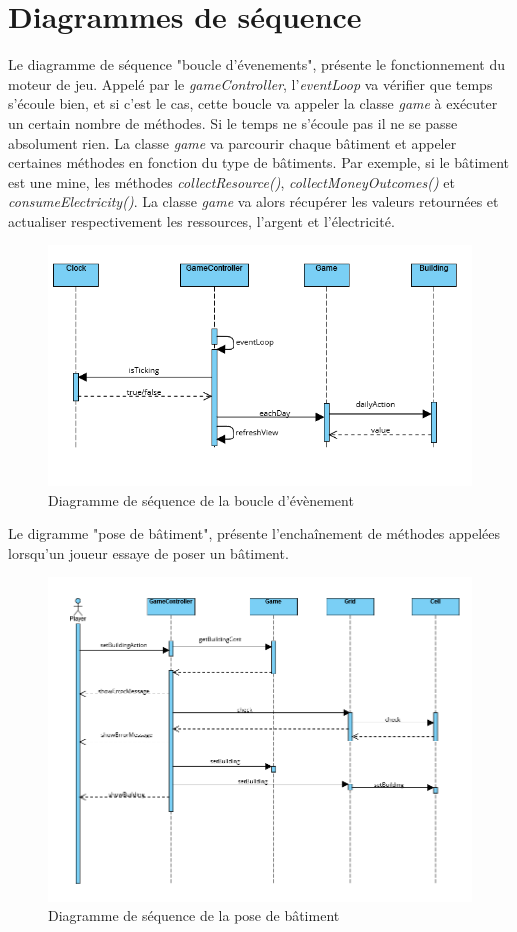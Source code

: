 \newpage
\section{Diagrammes de séquence}

Le diagramme de séquence "boucle d'évenements", présente le fonctionnement du moteur de jeu. Appelé par le \textit{gameController}, l'\textit{eventLoop} va vérifier que temps s'écoule bien, et si c'est le cas, cette boucle va appeler la classe \textit{game} à exécuter un certain nombre de méthodes. Si le temps ne s'écoule pas il ne se passe absolument rien. La classe \textit{game} va parcourir chaque bâtiment et appeler certaines méthodes en fonction du type de bâtiments. Par exemple, si le bâtiment est une mine, les méthodes \textit{collectResource()}, \textit{collectMoneyOutcomes()} et \textit{consumeElectricity()}. La classe \textit{game} va alors récupérer les valeurs retournées et actualiser respectivement les ressources, l'argent et l'électricité.

\begin{figure}[H]
    \centering
    \includegraphics[width=1\linewidth]{images/eventLoop.png}
    \caption{Diagramme de séquence de la boucle d'évènement}
    \label{fig:sequenceEvent}
\end{figure}

\pagebreak

Le digramme "pose de bâtiment", présente l'enchaînement de méthodes appelées lorsqu'un joueur essaye de poser un bâtiment.

\begin{figure}[H]
    \centering
    \includegraphics[width=1\linewidth]{images/setBuilding.png}
    \caption{Diagramme de séquence de la pose de bâtiment}
    \label{fig:sequenceBuilding}
\end{figure}
